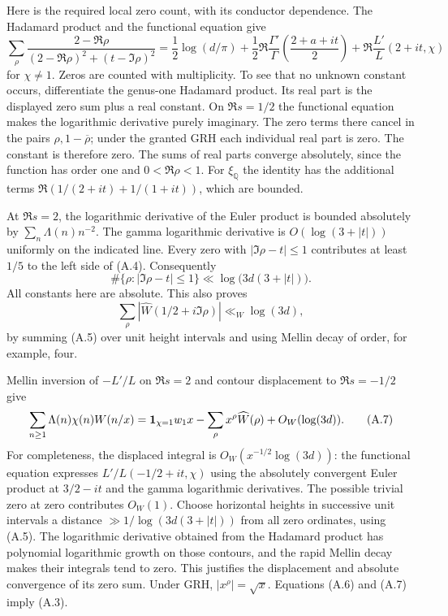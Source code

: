 Here is the required local zero count, with its conductor dependence.
The Hadamard product and the functional equation give
\[
 \sum_\rho
 \frac{2-\Re\rho}{(2-\Re\rho)^2+(t-\Im\rho)^2}
 =
 \frac12\log(d/\pi)
 +\frac12\Re\frac{\Gamma'}{\Gamma}\left(\frac{2+a+it}{2}\right)
 +\Re\frac{L'}{L}(2+it,\chi)                              \tag{A.4}
\]
for $\chi\ne1$. Zeros are counted with multiplicity.
To see that no unknown constant occurs, differentiate the
genus-one Hadamard product. Its real part is the displayed zero
sum plus a real constant. On $\Re s=1/2$ the functional equation
makes the logarithmic derivative purely imaginary. The zero
terms there cancel in the pairs $\rho,1-\overline\rho$;
under the granted GRH each individual real part is zero.
The constant is therefore zero. The sums of real parts converge
absolutely, since the function has order one and $0<\Re\rho<1$.
For $\xi_{\mathbb Q}$ the identity has the additional terms
$\Re(1/(2+it)+1/(1+it))$, which are bounded.

At $\Re s=2$, the logarithmic derivative of the Euler product
is bounded absolutely by $\sum_n\Lambda(n)n^{-2}$.
The gamma logarithmic derivative is
$O(\log(3+|t|))$ uniformly on the indicated line.
Every zero with $|\Im\rho-t|\le1$ contributes at least $1/5$
to the left side of (A.4). Consequently
\[
 \#\{\rho:|\Im\rho-t|\le1\}
       \ll \log\bigl(3d(3+|t|)\bigr).                    \tag{A.5}
\]
All constants here are absolute.
This also proves
\[
 \sum_\rho|\widehat W(1/2+i\Im\rho)|
                        \ll_W \log(3d),                 \tag{A.6}
\]
by summing (A.5) over unit height intervals and using Mellin
decay of order, for example, four.

Mellin inversion of $-L'/L$ on $\Re s=2$ and contour displacement
to $\Re s=-1/2$ give
\[
 \sum_{n\ge1}\Lambda(n)\chi(n)W(n/x)
 ={\bf1}_{\chi=1}w_1x
   -\sum_\rho x^\rho\widehat W(\rho)+O_W(\log(3d)).
                                                        \tag{A.7}
\]
For completeness, the displaced integral is
$O_W(x^{-1/2}\log(3d))$: the functional equation expresses
$L'/L(-1/2+it,\chi)$ using the absolutely convergent Euler
product at $3/2-it$ and the gamma logarithmic derivatives.
The possible trivial zero at zero contributes $O_W(1)$.
Choose horizontal heights in successive unit intervals a distance
$\gg1/\log(3d(3+|t|))$ from all zero ordinates, using (A.5).
The logarithmic derivative obtained from the Hadamard product
has polynomial logarithmic growth on those contours, and the
rapid Mellin decay makes their integrals tend to zero.
This justifies the displacement and absolute convergence of its
zero sum. Under GRH, $|x^\rho|=\sqrt{x}$.
Equations (A.6) and (A.7) imply (A.3).

